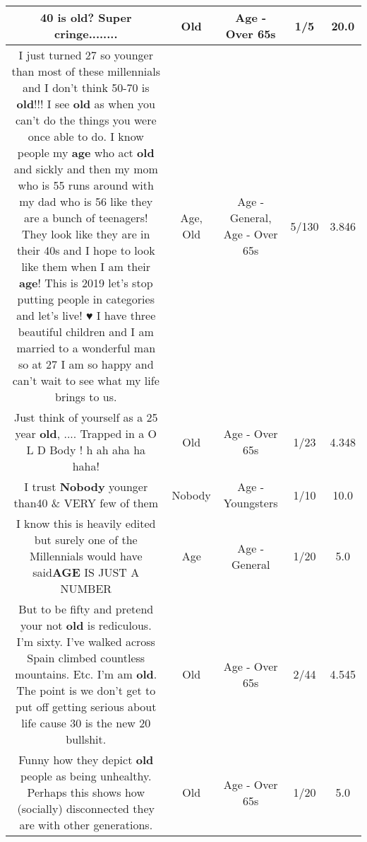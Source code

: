 \documentclass[11pt]{article}
\newlength\mylength
\begin{document}
\begin{center}
\begin{longtable}{|C{.65\mylength}|C{.30\mylength}|C{.12\mylength}|C{.12\mylength}|C{.12\mylength}|}
  \small 40 is \textbf{old}? Super cringe........\normalsize   & Old & Age - Over 65s & 1/5 & 20.0 \\  \hline
  \small I just turned 27 so younger than most of these millennials and I don't think 50-70 is \textbf{old}!!! I see \textbf{old} as when you can't do the things you were once able to do. I know people my \textbf{age} who act \textbf{old} and sickly and then my mom who is 55 runs around with my dad who is 56 like they are a bunch of teenagers! They look like they are in their 40s and I hope to look like them when I am their \textbf{age}! This is 2019 let's stop putting people in categories and let's live! ♥️ I have three beautiful children and I am married to a wonderful man so at 27 I am so happy and can't wait to see what my life brings to us.\normalsize   & Age, Old & Age - General, Age - Over 65s & 5/130 & 3.846 \\  \hline
  \small Just think of yourself as a 25 year \textbf{old}, .... Trapped in a O L D Body ! h ah aha ha haha!\normalsize   & Old & Age - Over 65s & 1/23 & 4.348 \\  \hline
  \small I trust \textbf{Nobody}  younger than40 \& VERY few of them\normalsize   & Nobody & Age - Youngsters & 1/10 & 10.0 \\  \hline
  \small I know this is heavily edited but surely one of the Millennials would have said\textbf{AGE} IS JUST A NUMBER\normalsize   & Age & Age - General & 1/20 & 5.0 \\  \hline
  \small But to be fifty and pretend your not \textbf{old} is rediculous. I'm sixty. I've walked across Spain climbed countless mountains. Etc.  I'm am \textbf{old}. The point is we don't get to put off getting serious about life cause 30 is the new 20 bullshit.\normalsize   & Old & Age - Over 65s & 2/44 & 4.545 \\  \hline
  \small Funny how they depict \textbf{old} people as being unhealthy.  Perhaps this shows how (socially) disconnected they are with other generations.\normalsize   & Old & Age - Over 65s & 1/20 & 5.0 \\  \hline

\end{longtable}
\end{center}
\end{document}
